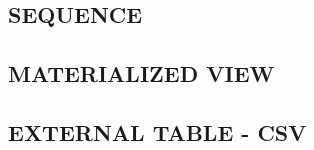 
\subsection{SEQUENCE}
\label{sec:dcl.sequence}


\subsection{MATERIALIZED VIEW}
\label{sec:dcl.materialized_view}

\subsection{EXTERNAL TABLE - CSV}
\label{sec:dcl.external_table}

